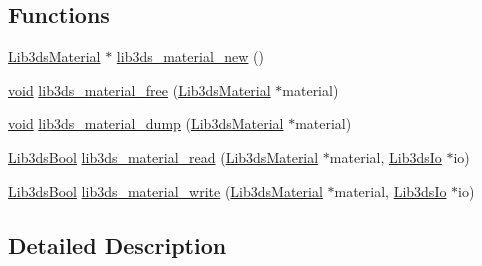 \subsection*{Functions}
\begin{DoxyCompactItemize}
\item 
\hyperlink{struct_lib3ds_material}{Lib3ds\-Material} $\ast$ \hyperlink{group__material_ga5e5e3512fd3043cfb0a31dfa97c0cd58}{lib3ds\-\_\-material\-\_\-new} ()
\item 
\hyperlink{group___u_a_v_objects_plugin_ga444cf2ff3f0ecbe028adce838d373f5c}{void} \hyperlink{group__material_ga52e489b8041dc1a695d12547acc60b06}{lib3ds\-\_\-material\-\_\-free} (\hyperlink{struct_lib3ds_material}{Lib3ds\-Material} $\ast$material)
\item 
\hyperlink{group___u_a_v_objects_plugin_ga444cf2ff3f0ecbe028adce838d373f5c}{void} \hyperlink{group__material_ga7e1543b3b2a049c32de98b94e3afcec5}{lib3ds\-\_\-material\-\_\-dump} (\hyperlink{struct_lib3ds_material}{Lib3ds\-Material} $\ast$material)
\item 
\hyperlink{types_8h_a89dd7398a9ebbbf28011f8c32df67ad3}{Lib3ds\-Bool} \hyperlink{group__material_gaf98a27e9ffa6339e092626e1ac456398}{lib3ds\-\_\-material\-\_\-read} (\hyperlink{struct_lib3ds_material}{Lib3ds\-Material} $\ast$material, \hyperlink{struct_lib3ds_io}{Lib3ds\-Io} $\ast$io)
\item 
\hyperlink{types_8h_a89dd7398a9ebbbf28011f8c32df67ad3}{Lib3ds\-Bool} \hyperlink{group__material_ga71bd125e3146ebc0f11e4fe19b7677af}{lib3ds\-\_\-material\-\_\-write} (\hyperlink{struct_lib3ds_material}{Lib3ds\-Material} $\ast$material, \hyperlink{struct_lib3ds_io}{Lib3ds\-Io} $\ast$io)
\end{DoxyCompactItemize}


\subsection{Detailed Description}


